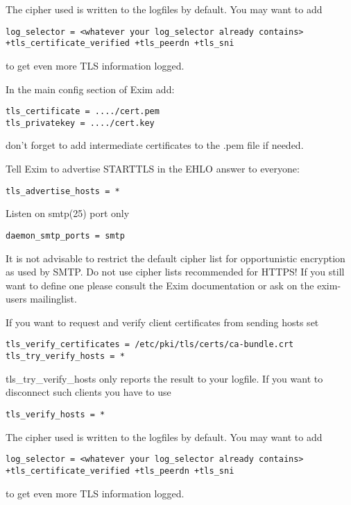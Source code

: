 The cipher used is written to the logfiles by default. You may want to add
\begin{lstlisting}
log_selector = <whatever your log_selector already contains> +tls_certificate_verified +tls_peerdn +tls_sni
\end{lstlisting}
to get even more TLS information logged.



In the main config section of Exim add:

\begin{lstlisting}
tls_certificate = ..../cert.pem
tls_privatekey = ..../cert.key
\end{lstlisting}
don't forget to add intermediate certificates to the .pem file if needed.

Tell Exim to advertise STARTTLS in the EHLO answer to everyone:
\begin{lstlisting}
tls_advertise_hosts = *
\end{lstlisting}

Listen on smtp(25) port only
\begin{lstlisting}
daemon_smtp_ports = smtp
\end{lstlisting}

It is not advisable to restrict the default cipher list for opportunistic encryption as used by SMTP. Do not use cipher lists recommended for HTTPS! If you still want to define one please consult the Exim documentation or ask on the exim-users mailinglist.

If you want to request and verify client certificates from sending hosts set
\begin{lstlisting}
tls_verify_certificates = /etc/pki/tls/certs/ca-bundle.crt
tls_try_verify_hosts = *
\end{lstlisting}

tls\_try\_verify\_hosts only reports the result to your logfile. If you want to disconnect such clients you have to use
\begin{lstlisting}
tls_verify_hosts = *
\end{lstlisting}

The cipher used is written to the logfiles by default. You may want to add
\begin{lstlisting}
log_selector = <whatever your log_selector already contains> +tls_certificate_verified +tls_peerdn +tls_sni
\end{lstlisting}
to get even more TLS information logged.


